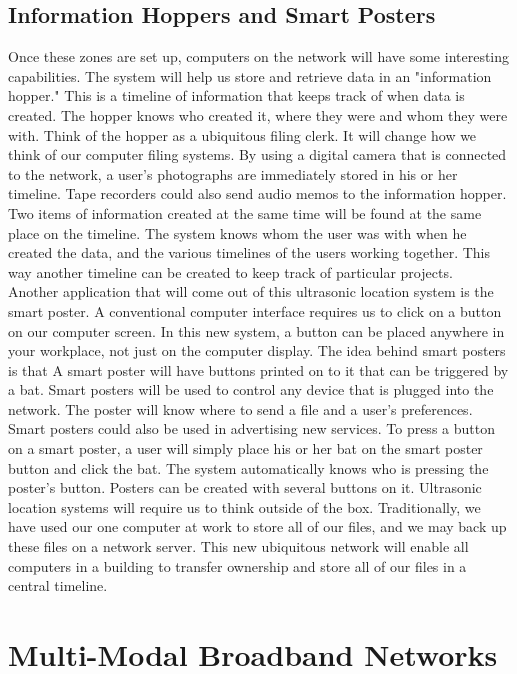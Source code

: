\documentclass[12pt]{report}
\begin{document}
\section{Information Hoppers and Smart Posters}
\hspace*{0.5in}Once these zones are set up, computers on the network will have some interesting capabilities. The system will help us store and retrieve data in an "information hopper." This is a timeline of information that keeps track of when data is created. The hopper knows who created it, where they were and whom they were with. Think of the hopper as a ubiquitous filing clerk. It will change how we think of our computer filing systems. By using a digital camera that is connected to the network, a user's photographs are immediately stored in his or her timeline. Tape recorders could also send audio memos to the information hopper. Two items of information created at the same time will be found at the same place on the timeline. The system knows whom the user was with when he created the data, and the various timelines of the users working together. This way another timeline can be created to keep track of particular projects.
\\\hspace*{0.5in}Another application that will come out of this ultrasonic location system is the smart poster. A conventional computer interface requires us to click on a button on our computer screen. In this new system, a button can be placed anywhere in your workplace, not just on the computer display. The idea behind smart posters is that A smart poster will have buttons printed on to it that can be triggered by a bat. Smart posters will be used to control any device that is plugged into the network. The poster will know where to send a file and a user's preferences. Smart posters could also be used in advertising new services. To press a button on a smart poster, a user will simply place his or her bat on the smart poster button and click the bat. The system automatically knows who is pressing the poster's button. Posters can be created with several buttons on it. Ultrasonic location systems will require us to think outside of the box. Traditionally, we have used our one computer at work to store all of our files, and we may back up these files on a network server. This new ubiquitous network will enable all computers in a building to transfer ownership and store all of our files in a central timeline.


\chapter{Multi-Modal Broadband Networks}
\end{document}
